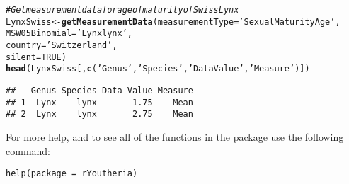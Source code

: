 \documentclass[a4paper]{article}\usepackage[]{graphicx}\usepackage[]{color}
\makeatletter
\newcommand{\hlnum}[1]{\textcolor[rgb]{0.686,0.059,0.569}{#1}}%
\newcommand{\hlstr}[1]{\textcolor[rgb]{0.192,0.494,0.8}{#1}}%
\newcommand{\hlcom}[1]{\textcolor[rgb]{0.678,0.584,0.686}{\textit{#1}}}%
\newcommand{\hlstd}[1]{\textcolor[rgb]{0.345,0.345,0.345}{#1}}%
\newcommand{\hlkwb}[1]{\textcolor[rgb]{0.69,0.353,0.396}{#1}}%
\newcommand{\hlkwc}[1]{\textcolor[rgb]{0.333,0.667,0.333}{#1}}%
\newcommand{\hlkwd}[1]{\textcolor[rgb]{0.737,0.353,0.396}{\textbf{#1}}}%
\newenvironment{kframe}{%
 \def\at@end@of@kframe{}%
 \ifinner\ifhmode%
  \def\at@end@of@kframe{\end{minipage}}%
  \begin{minipage}{\columnwidth}%
 \fi\fi%
 \def\FrameCommand##1{\hskip\@totalleftmargin \hskip-\fboxsep
 \colorbox{shadecolor}{##1}\hskip-\fboxsep
     \hskip-\linewidth \hskip-\@totalleftmargin \hskip\columnwidth}%
 \MakeFramed {\advance\hsize-\width
   \@totalleftmargin\z@ \linewidth\hsize
   \@setminipage}}%
 {\par\unskip\endMakeFramed%
 \at@end@of@kframe}
\newenvironment{knitrout}{}{} %
\makeatother
\begin{document}
\begin{knitrout}
\begin{kframe}
\begin{alltt}
\hlcom{# Get measurement data for age of maturity of Swiss Lynx}
\hlstd{LynxSwiss} \hlkwb{<-} \hlkwd{getMeasurementData}\hlstd{(}\hlkwc{measurementType} \hlstd{=} \hlstr{'Sexual Maturity Age'}\hlstd{,}
                                \hlkwc{MSW05Binomial} \hlstd{=} \hlstr{'Lynx lynx'}\hlstd{,}
                                \hlkwc{country} \hlstd{=} \hlstr{'Switzerland'}\hlstd{,}
                                \hlkwc{silent} \hlstd{=} \hlnum{TRUE}\hlstd{)}
\hlkwd{head}\hlstd{(LynxSwiss[,}\hlkwd{c}\hlstd{(}\hlstr{'Genus'}\hlstd{,}\hlstr{'Species'}\hlstd{,}\hlstr{'Data Value'}\hlstd{,}\hlstr{'Measure'}\hlstd{)])}
\end{alltt}
\begin{verbatim}
##   Genus Species Data Value Measure
## 1  Lynx    lynx       1.75    Mean
## 2  Lynx    lynx       2.75    Mean
\end{verbatim}
\end{kframe}
\end{knitrout}

For more help, and to see all of the functions in the package use the following command:

\begin{verbatim}
help(package = rYoutheria)
\end{verbatim}
\end{document}
